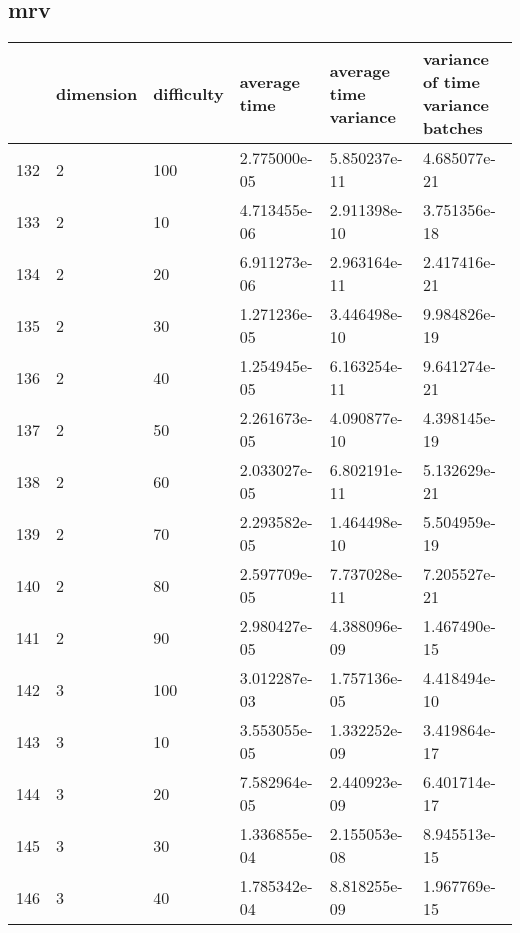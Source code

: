 \documentclass{article}
\begin{document}
\subsection{mrv}
\begin{center}
\begin{tabular}{llllll}
\toprule
{} & dimension & difficulty &  average time & average time variance & variance of time variance batches \\
\midrule
132 &         2 &        100 &  2.775000e-05 &          5.850237e-11 &                      4.685077e-21 \\
133 &         2 &         10 &  4.713455e-06 &          2.911398e-10 &                      3.751356e-18 \\
134 &         2 &         20 &  6.911273e-06 &          2.963164e-11 &                      2.417416e-21 \\
135 &         2 &         30 &  1.271236e-05 &          3.446498e-10 &                      9.984826e-19 \\
136 &         2 &         40 &  1.254945e-05 &          6.163254e-11 &                      9.641274e-21 \\
137 &         2 &         50 &  2.261673e-05 &          4.090877e-10 &                      4.398145e-19 \\
138 &         2 &         60 &  2.033027e-05 &          6.802191e-11 &                      5.132629e-21 \\
139 &         2 &         70 &  2.293582e-05 &          1.464498e-10 &                      5.504959e-19 \\
140 &         2 &         80 &  2.597709e-05 &          7.737028e-11 &                      7.205527e-21 \\
141 &         2 &         90 &  2.980427e-05 &          4.388096e-09 &                      1.467490e-15 \\
142 &         3 &        100 &  3.012287e-03 &          1.757136e-05 &                      4.418494e-10 \\
143 &         3 &         10 &  3.553055e-05 &          1.332252e-09 &                      3.419864e-17 \\
144 &         3 &         20 &  7.582964e-05 &          2.440923e-09 &                      6.401714e-17 \\
145 &         3 &         30 &  1.336855e-04 &          2.155053e-08 &                      8.945513e-15 \\
146 &         3 &         40 &  1.785342e-04 &          8.818255e-09 &                      1.967769e-15 \\

\end{tabular}
\end{center}
\end{document}

